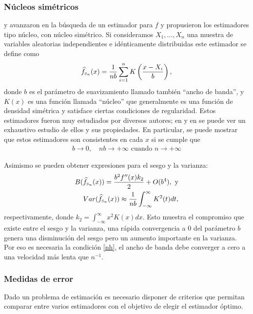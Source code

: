 \subsubsection{Núcleos simétricos}
\citet{Rosenblatt56} y \citet{Parzen62} avanzaron en la búsqueda de un estimador para $f$ y propusieron los estimadores tipo núcleo, con núcleo simétrico. Si consideramos $X_1,\ldots,X_n$ una muestra de variables aleatorias independientes e idénticamente distribuidas este estimador se define como
\begin{align}
\label{KS}
\widehat{f}_{\text{\tiny{S}}_n}(x)=\frac{1}{n b} \sum_{i=1}^n K \left(\dfrac{x-X_i}{b}\right),
\end{align}
donde $b$ es el parámetro de suavizamiento llamado también ``ancho de banda'', y $K(x)$ es una función llamada ``núcleo'' que generalmente es una función de densidad simétrica y satisface ciertas condiciones de regularidad. Estos estimadores fueron muy estudiados por diversos autores; en \citet{Silverman1986} y en \citet{Scott1992} se puede ver un exhaustivo estudio de ellos y sus propiedades. 
En particular, se puede mostrar que estos estimadores son consistentes en cada $x$ si se cumple que  
\begin{align}
\label{nh}
b \to 0,  \quad nb \to +\infty \text{ cuando } n \to +\infty
\end{align}	

Asimismo se pueden obtener expresiones para el sesgo y la varianza:
\begin{align}
\label{SesgoVar}
B(\widehat{f}_{\text{\tiny{S}}_n}(x))=\dfrac{b^2 f''(x) k_2}{2}+O(b^4), \text{ y}\\
Var(\widehat{f}_{\text{\tiny{S}}_n}(x))\approx \dfrac{1}{nb} \int_{-\infty}^{\infty} K^2(t)dt,
\end{align}	
respectivamente, donde $k_2=\displaystyle{\int_{-\infty}^{\infty}} x^2 K(x)dx$. Esto muestra el compromiso que existe entre el sesgo y la varianza, una rápida convergencia a $0$ del parámetro $b$ genera una disminución del sesgo pero un aumento importante en la varianza. Por eso es necesaria la condición \eqref{nh}, el ancho de banda debe converger a cero a una velocidad más lenta que $n^{-1}.$ 

\subsubsection{Medidas de error}

Dado un problema de estimación es necesario disponer de criterios que permitan comparar entre varios estimadores con el objetivo de elegir el estimador óptimo. 

